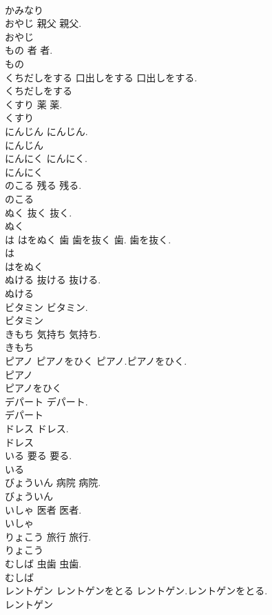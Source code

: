 \documentclass[8pt]{extreport}
\begin{document}
\begin{CJK}{UTF8}{min}
\\	かみなり
\\	おやじ	親父	親父.	
\\	おやじ
\\	もの	者	者.	
\\	もの
\\	くちだしをする	口出しをする	口出しをする.	
\\	くちだしをする
\\	くすり	薬	薬.	
\\	くすり
\\	にんじん		にんじん.	
\\	にんじん
\\	にんにく		にんにく.	
\\	にんにく
\\	のこる	残る	残る.	
\\	のこる
\\	ぬく	抜く	抜く.	
\\	ぬく
\\	は はをぬく	歯 歯を抜く	歯. 歯を抜く.	
\\	は
\\	はをぬく
\\	ぬける	抜ける	抜ける.	
\\	ぬける
\\	ビタミン		ビタミン.	
\\	ビタミン
\\	きもち	気持ち	気持ち.	
\\	きもち
\\	ピアノ ピアノをひく		ピアノ.ピアノをひく.	
\\	ピアノ
\\	ピアノをひく
\\	デパート		デパート.	
\\	デパート
\\	ドレス		ドレス.	
\\	ドレス
\\	いる	要る	要る.	
\\	いる
\\	びょういん	病院	病院.	
\\	びょういん
\\	いしゃ	医者	医者.	
\\	いしゃ
\\	りょこう	旅行	旅行.	
\\	りょこう
\\	むしば	虫歯	虫歯.	
\\	むしば
\\	レントゲン レントゲンをとる		レントゲン.レントゲンをとる.	
\\	レントゲン

\end{CJK}
\end{document}

